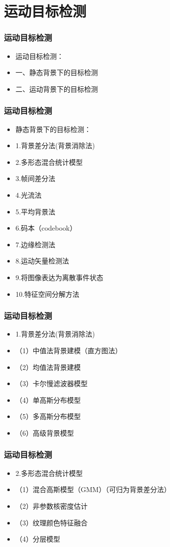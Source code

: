 \documentclass[notheorems,mathserif,table,compress]{beamer}  %
\begin{document}
\section{运动目标检测}

\begin{frame}
  \frametitle{运动目标检测}  
  \begin{itemize}
  \item 运动目标检测：
  \item 一、静态背景下的目标检测
  \item 二、运动背景下的目标检测
  \end{itemize}
\end{frame}

\begin{frame}
  \frametitle{运动目标检测}  
  \begin{itemize}
  \item 静态背景下的目标检测：
  \item 1.背景差分法(背景消除法)
  \item 2.多形态混合统计模型
  \item 3.帧间差分法
  \item 4.光流法
  \item 5.平均背景法
  \item 6.码本（codebook）
  \item 7.边缘检测法
  \item 8.运动矢量检测法
  \item 9.将图像表达为离散事件状态
  \item 10.特征空间分解方法
  \end{itemize}
\end{frame}

\begin{frame}
  \frametitle{运动目标检测}  
  \begin{itemize}
  \item 1.背景差分法(背景消除法)
  \item （1）中值法背景建模（直方图法） 
  \item （2）均值法背景建模
  \item （3）卡尔慢滤波器模型
  \item （4）单高斯分布模型
  \item （5）多高斯分布模型
  \item （6）高级背景模型
  \end{itemize}
\end{frame}

\begin{frame}
  \frametitle{运动目标检测}  
  \begin{itemize}
  \item 2.多形态混合统计模型
  \item （1）混合高斯模型（GMM）（可归为背景差分法）
  \item （2）非参数核密度估计
  \item （3）纹理颜色特征融合
  \item （4）分层模型
  \end{itemize}
\end{frame}
\end{document}
